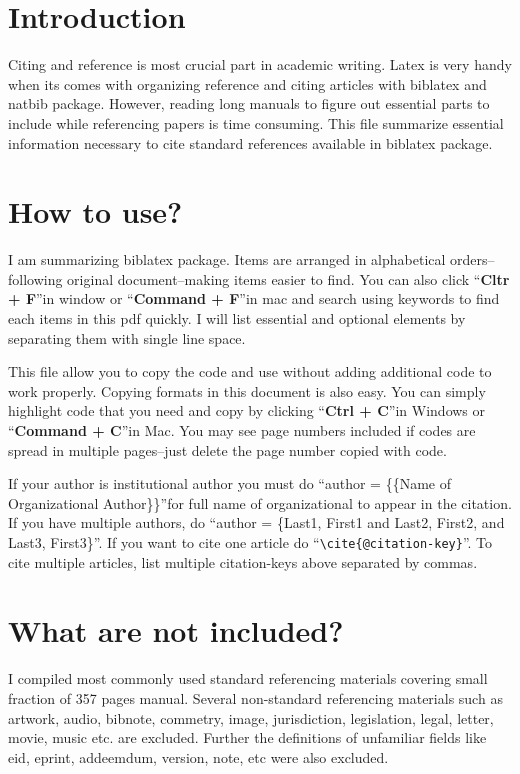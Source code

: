 \documentclass{article}
\begin{document}
\begin{multicols}{2}
\section*{Introduction}
Citing and reference is most crucial part in academic writing. Latex is very handy when its comes with organizing reference and citing articles with biblatex and natbib package. However, reading long manuals to figure out essential parts to include while referencing papers is time consuming. This file summarize essential information necessary to cite standard references available in biblatex package.

\section*{How to use?}
I am summarizing biblatex package. Items are arranged in alphabetical orders--following original document--making items easier to find. You can also click \textquotedblleft \textbf{Cltr + F}\textquotedblright in window or \textquotedblleft \textbf{Command + F}\textquotedblright in mac and search using keywords to find each items in this pdf quickly. I will list essential and optional elements by separating them with single line space.

This file allow you to copy the code and use without adding additional code to work properly. Copying formats in this document is also easy. You can simply highlight code that you need and copy by clicking \textquotedblleft \textbf{Ctrl + C}\textquotedblright in Windows or \textquotedblleft \textbf{Command + C}\textquotedblright in Mac. You may see page numbers included if codes are spread in multiple pages--just delete the page number copied with code.

If your author is institutional author you must do \textquotedblleft author = \{\{Name of Organizational Author\}\}\textquotedblright for full name of organizational to appear in the citation. If you have multiple authors, do \textquotedblleft author = \{Last1, First1 and Last2, First2, and Last3, First3\}\textquotedblright. If you want to cite one article do \textquotedblleft \verb|\cite{@citation-key}|\textquotedblright. To cite multiple articles, list multiple citation-keys above separated by commas.

\section*{What are not included?}
I compiled most commonly used standard referencing materials covering small fraction of 357 pages manual. Several non-standard referencing materials such as artwork, audio, bibnote, commetry, image, jurisdiction, legislation, legal, letter, movie, music etc. are excluded. Further the definitions of unfamiliar fields like eid, eprint, addeemdum, version, note, etc were also excluded.


\end{multicols}
\end{document}
